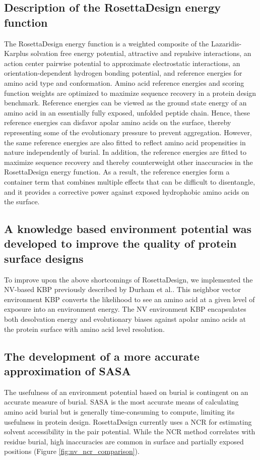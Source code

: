 \subsection{Description of the RosettaDesign energy function}
The RosettaDesign energy function is a weighted composite of the Lazaridis-Karplus solvation free energy potential, attractive and repulsive interactions, an action center pairwise potential to approximate electrostatic interactions, an orientation-dependent hydrogen bonding potential\citep{Kortemme:2003td}, and reference energies for amino acid type and conformation\citep{Dantas:2003vt}. 
Amino acid reference energies and scoring function weights are optimized to maximize sequence recovery in a protein design benchmark.
Reference energies can be viewed as the ground state energy of an amino acid in an essentially fully exposed, unfolded peptide chain.
Hence, these reference energies can disfavor apolar amino acids on the surface, thereby representing some of the evolutionary pressure to prevent aggregation.
However, the same reference energies are also fitted to reflect amino acid propensities in nature independently of burial.
In addition, the reference energies are fitted to maximize sequence recovery and thereby counterweight other inaccuracies in the RosettaDesign energy function.
As a result, the reference energies form a container term that combines multiple effects that can be difficult to disentangle, and it provides a corrective power against exposed hydrophobic amino acids on the surface.

\subsection{A knowledge based environment potential was developed to improve the quality of protein surface designs}
To improve upon the above shortcomings of RosettaDesign, we implemented the \acf{NV}-based \ac{KBP} previously described by Durham et al.\citep{Durham:2009kt}.
This neighbor vector environment \ac{KBP} converts the likelihood to see an amino acid at a given level of exposure into an environment energy.
The \ac{NV} environment \ac{KBP} encapsulates both desolvation energy and evolutionary biases against apolar amino acids at the protein surface with amino acid level resolution.

\subsection{The development of a more accurate approximation of \acs{SASA} }
The usefulness of an environment potential based on burial is contingent on an accurate measure of burial.
\ac{SASA} is the most accurate means of calculating amino acid burial but is generally time-consuming to compute, limiting its usefulness in protein design.
RosettaDesign currently uses a \ac{NCR} for estimating solvent accessibility in the pair potential.
While the \ac{NCR} method correlates with residue burial, high inaccuracies are common in surface and partially exposed positions (Figure \ref{fig:nv_ncr_comparison}). 

